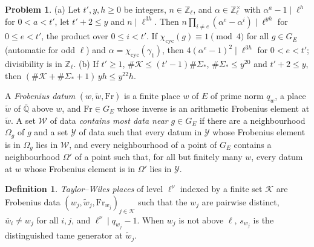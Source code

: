\documentclass[reqno]{amsart}
\theoremstyle{definition}
\newtheorem{problem}{Problem}[section]
\newtheorem{definition}{Definition}[section]
\theoremstyle{plain}
\newcommand{\Z}{\mathbb{Z}}
\newcommand{\Q}{\mathbb{Q}}
\newcommand{\Kc}{\mathcal{K}}
\newcommand{\cyc}{\chi_{\mathrm{cyc}}}
\newcommand{\Fr}{\mathrm{Fr}}
\begin{document}
\begin{problem}\label{pr:count}
(a) Let \(t', y, h \ge 0\) be integers, \(n \in \Z_\ell\), and \(\alpha \in \Z_\ell^\times\) with \(\alpha^a - 1 \mid \ell^h\) for \(0 < a < t'\), let \(t' + 2 \le y\) and \(n \mid \ell^{3h}\).  Then \(n\prod_{i \ne e}(\alpha^e - \alpha^i) \mid \ell^{yh}\) for \(0 \le e < t'\), the product over \(0 \le i < t'\).  If \(\cyc(g) \equiv 1 \pmod 4\) for all \(g \in G_E\) (automatic for odd \(\ell\)) and \(\alpha = \cyc(\gamma_1)\), then \(4(\alpha^e - 1)^2 \mid \ell^{3h}\) for \(0 < e < t'\); divisibility is in \(\Z_\ell\).
(b) If \(t' \ge 1\), \(\#\Kc \le (t'-1)\#\Sigma_*\), \(\#\Sigma_* \le y^{20}\) and \(t' + 2 \le y\), then \((\#\Kc + \#\Sigma_* + 1)\,yh \le y^{22}h\).
\end{problem}

A \emph{Frobenius datum} \((w, \tilde w, \Fr)\) is a finite place \(w\) of \(E\) of prime norm \(q_w\), a place \(\tilde w\) of \(\bar{\Q}\) above \(w\), and \(\Fr \in G_E\) whose inverse is an arithmetic Frobenius element at \(\tilde w\).  A set \(\mathcal W\) of data \emph{contains most data near} \(g \in G_E\) if there are a neighbourhood \(\Omega_g\) of \(g\) and a set \(\mathcal Y\) of data such that every datum in \(\mathcal Y\) whose Frobenius element is in \(\Omega_g\) lies in \(\mathcal W\), and every neighbourhood of a point of \(G_E\) contains a neighbourhood \(\Omega'\) of a point such that, for all but finitely many \(w\), every datum at \(w\) whose Frobenius element is in \(\Omega'\) lies in \(\mathcal Y\).

\begin{definition}\label{def:tw}
\emph{Taylor--Wiles places} of level \(\ell^\nu\) indexed by a finite set \(\Kc\) are Frobenius data \((w_j, \tilde w_j, \Fr_{w_j})_{j \in \Kc}\) such that the \(w_j\) are pairwise distinct, \(\bar w_i \ne w_j\) for all \(i, j\), and \(\ell^\nu \mid q_{w_j} - 1\).  When \(w_j\) is not above \(\ell\), \(s_{w_j}\) is the distinguished tame generator at \(\tilde w_j\).
\end{definition}
\end{document}

